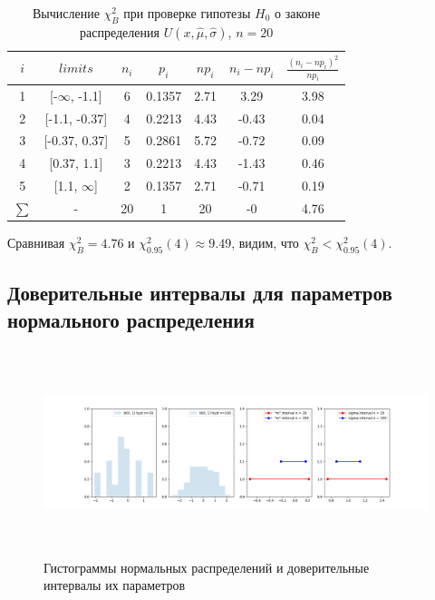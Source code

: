 \documentclass[a4paper,14pt]{article}
\begin{document}
	\begin{table}[H]
		\centering
		\begin{tabular}{| c | c | c | c | c | c | c |}
			\hline
			$i$ & $limits$         &   $n_i$ &    $p_i$ &   $np_i$ &   $n_i - np_i$ &   $\frac{(n_i-np_i)^2}{np_i}$ \\
			\hline
			1 & [-$\infty$, -1.1] &     6 & 0.1357 &   2.71 &        3.29 &                        3.98 \\
			2 & [-1.1, -0.37]  &     4 & 0.2213 &   4.43 &        -0.43 &                        0.04 \\
			3 & [-0.37, 0.37]  &    5 & 0.2861 &   5.72 &         -0.72 &                        0.09 \\
			4 & [0.37, 1.1]    &     3 & 0.2213 &   4.43 &        -1.43 &                        0.46 \\
			5 & [1.1, $\infty$]   &     2 & 0.1357 &   2.71 &        -0.71 &                        0.19 \\
			$\sum$ & -              &    20 & 1      &  20    &        -0    &                        4.76 \\
			\hline
		\end{tabular}
		\caption{ Вычисление $\chi^{2}_{B}$ при проверке гипотезы $H_{0}$ о законе распределения $U(x,\hat{\mu}, \hat{\sigma})$, $n=20$}
		\label{tab:laplace_chi_2}
	\end{table}

	\noindent Сравнивая $\chi^{2}_{B} = 4.76$ и $\chi^{2}_{0.95}(4) \approx 9.49$, видим, что $\chi^{2}_{B} < \chi^{2}_{0.95}(4)$.
	\\
	\subsection{Доверительные интервалы для параметров нормального распределения}
	\begin{figure}[H]
		\centering
		\includegraphics[width = 20cm, height = 6cm]{../image/lab8_1.png}
		\caption{Гистограммы нормальных распределений и доверительные интервалы их параметров}
		\label{w_pert}
	\end{figure}
	
\end{document}
